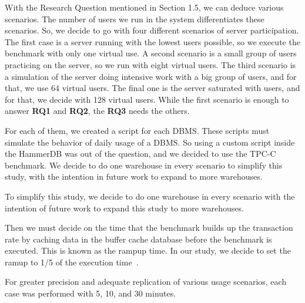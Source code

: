 With the Research Question mentioned in Section 1.5, we can deduce various scenarios. The number of users we run in the system differentiates these scenarios. So, we decide to go with four different scenarios of server participation. The first case is a server running with the lowest users possible, so we execute the benchmark with only one virtual use. A second scenario is a small group of users practicing on the server, so we run with eight virtual users. The third scenario is a simulation of the server doing intensive work with a big group of users, and for that, we use 64 virtual users. The final one is the server saturated with users, and for that, we decide with 128 virtual users. 
While the first scenario is enough to answer \textbf{RQ1} and \textbf{RQ2}, the \textbf{RQ3} needs the others.
 
 
 For each of them, we created a script for each DBMS.  These scripts must simulate the behavior of daily usage of a DBMS. So using a custom script inside the HammerDB was out of the question, and we decided to use the TPC-C benchmark. We decide to do one warehouse in every scenario to simplify this study, with the intention in future work to expand to more warehouses. 
 

To simplify this study, we decide to do one warehouse in every scenario with the intention of future work to expand this study to more warehouses. 




Then we must decide on the time that the benchmark builds up the transaction rate by caching data in the buffer cache database before the benchmark is executed. This is known as the rampup time. In our study, we decide to set the ramup to 1/5 of the execution time~\cite{hammerdb}.

For greater precision and adequate replication of various usage scenarios, each case was performed with 5, 10, and 30 minutes.



